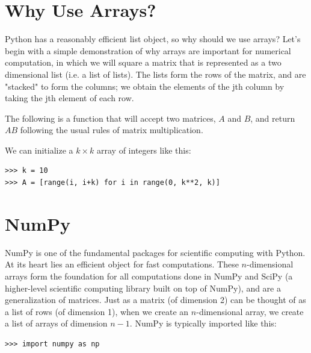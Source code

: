 \label{lab:NumPyArrays}

\section*{Why Use Arrays?} Python has a reasonably efficient list object, 
so why should we use arrays? Let's begin with a simple demonstration of why
arrays are important for numerical computation, in which
we will square a matrix that is represented as a two dimensional list (i.e. a list of lists). The lists form the rows of the matrix, and are "stacked" to form the columns; we obtain the elements of the jth column by taking the jth element of each row.

The following is a function that will accept two matrices, $A$ and $B$, and return $AB$ following the usual rules
of matrix multiplication. 



We can initialize a $k \times k$ array of integers like this:
\begin{lstlisting}
>>> k = 10 
>>> A = [range(i, i+k) for i in range(0, k**2, k)]
\end{lstlisting}

\section*{NumPy} NumPy is one of the fundamental packages for scientific
computing with Python. At its heart lies an efficient 
object for fast computations. These $n$-dimensional arrays form
the foundation for all computations done in NumPy and SciPy (a
higher-level scientific computing library built on top of NumPy), and are a generalization of matrices. Just as a matrix (of dimension 2) can be thought of as a list of rows (of dimension 1), when we create an $n$-dimensional array, we create a list of arrays of dimension $n-1$. NumPy
is typically imported like this: 


\begin{lstlisting}
>>> import numpy as np
\end{lstlisting}


